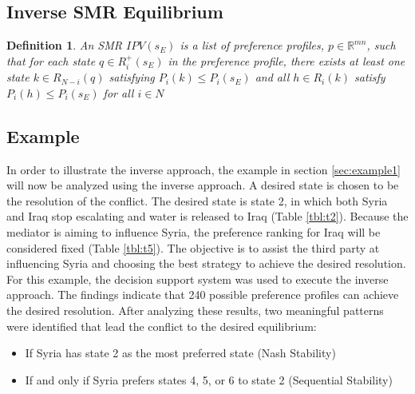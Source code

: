 \documentclass[letterpaper,12pt,titlepage,oneside,final]{book}
\newtheorem{definition}[lemma]{Definition}
\begin{document}
\subsection{Inverse SMR Equilibrium}

\begin{definition}
\label{def:smr_inv}
\rm
An \emph{SMR $IPV(s_E)$} is a list of preference profiles, $p \in \mathbb{R}^{mn}$, such that for each state $q \in R^{+}_{i}(s_E)$ in the preference profile, there exists at least one state $k\in R_{N-i}(q)$ satisfying $P_i(k)\leq P_i(s_E)$ and all $h \in R_{i}(k)$ satisfy $P_i(h)\leq P_i(s_E)$ for all %
$i \in N$ 
\end{definition}




\subsection{Example}

In order to illustrate the inverse approach, the example in section \ref{sec:example1} will now be analyzed using the inverse approach. A desired state is chosen to be the resolution of the conflict. The desired state is state 2, in which both Syria and Iraq stop escalating and water is released to Iraq (Table \ref{tbl:t2}). Because the mediator is aiming to influence Syria, the preference ranking for Iraq will be considered fixed (Table \ref{tbl:t5}). The objective is to assist the third party at influencing Syria and choosing the best strategy to achieve the desired resolution. For this example, the decision support system was used to execute the inverse approach. The findings indicate that 240 possible preference profiles can achieve the desired resolution. After analyzing these results, two meaningful patterns were identified that lead the conflict to the desired equilibrium:
\begin{itemize}
\item If Syria has state 2 as the most preferred state (Nash Stability)
\item If and only if Syria prefers states 4, 5, or 6 to state 2 (Sequential Stability)
\end{itemize}
\end{document}
